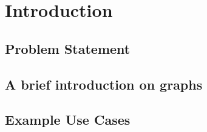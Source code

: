 \chapter{Introduction}\label{ch:introduction}

\section{Problem Statement}\label{sec:problem-statement}


\section{A brief introduction on graphs}\label{sec:graph-intro}


\section{Example Use Cases}\label{sec:example-use-cases}

